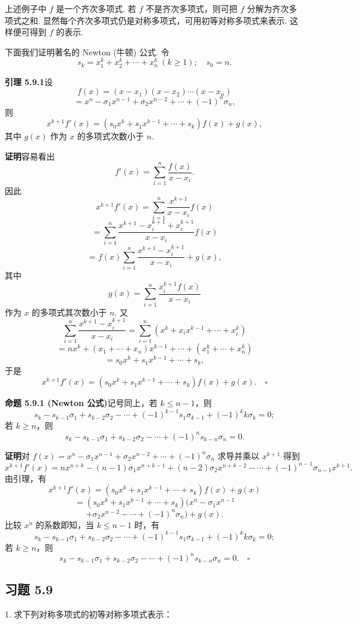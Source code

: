\documentclass[UTF8, 12pt, fontset=fandol, oneside]{ctexart}
\begin{document}
上述例子中 $f$ 是一个齐次多项式. 若 $f$ 不是齐次多项式，则可把 $f$ 分解为齐次多项式之和. 显然每个齐次多项式仍是对称多项式，可用初等对称多项式来表示. 这样便可得到 $f$ 的表示.

下面我们证明著名的 Newton (牛顿) 公式. 令
\[
s_k=x_1^k+x_2^k+\cdots+x_n^k\ (k\geq 1);\quad s_0=n.
\]

\noindent\textbf{引理 5.9.1}\quad 设
\[
f(x)=(x-x_1)(x-x_2)\cdots(x-x_n)
\]
\[
=x^n-\sigma_1x^{n-1}+\sigma_2x^{n-2}+\cdots+(-1)^n\sigma_n,
\]
则
\[
x^{k+1}f'(x)=(s_0x^k+s_1x^{k-1}+\cdots+s_k)f(x)+g(x),
\]
其中 $g(x)$ 作为 $x$ 的多项式次数小于 $n$.

\noindent\textbf{证明}\quad 容易看出
\[
f'(x)=\sum_{i=1}^n\frac{f(x)}{x-x_i}.
\]
因此
\[
x^{k+1}f'(x)=\sum_{i=1}^n\frac{x^{k+1}}{x-x_i}f(x)
\]
\[
=\sum_{i=1}^n\frac{x^{k+1}-x_i^{k+1}+x_i^{k+1}}{x-x_i}f(x)
\]
\[
=f(x)\sum_{i=1}^n\frac{x^{k+1}-x_i^{k+1}}{x-x_i}+g(x),
\]
其中
\[
g(x)=\sum_{i=1}^n\frac{x_i^{k+1}f(x)}{x-x_i}
\]
作为 $x$ 的多项式其次数小于 $n$. 又
\[
\sum_{i=1}^n\frac{x^{k+1}-x_i^{k+1}}{x-x_i}
=\sum_{i=1}^n(x^k+x_ix^{k-1}+\cdots+x_i^k)
\]
\[
=nx^k+(x_1+\cdots+x_n)x^{k-1}+\cdots+(x_1^k+\cdots+x_n^k)
\]
\[
=s_0x^k+s_1x^{k-1}+\cdots+s_k,
\]
于是
\[
x^{k+1}f'(x)=(s_0x^k+s_1x^{k-1}+\cdots+s_k)f(x)+g(x).\quad \square
\]

\noindent\textbf{命题 5.9.1 (Newton 公式)}\quad 记号同上，若 $k\leq n-1$，则
\[
s_k-s_{k-1}\sigma_1+s_{k-2}\sigma_2-\cdots+(-1)^{k-1}s_1\sigma_{k-1}+(-1)^kk\sigma_k=0;
\]
若 $k\geq n$，则
\[
s_k-s_{k-1}\sigma_1+s_{k-2}\sigma_2-\cdots+(-1)^ns_{k-n}\sigma_n=0.
\]

\noindent\textbf{证明}\quad 对 $f(x)=x^n-\sigma_1x^{n-1}+\sigma_2x^{n-2}+\cdots+(-1)^n\sigma_n$ 求导并乘以 $x^{k+1}$ 得到
\[
x^{k+1}f'(x)=nx^{n+k}-(n-1)\sigma_1x^{n+k-1}+(n-2)\sigma_2x^{n+k-2}-\cdots+(-1)^{n-1}\sigma_{n-1}x^{k+1}.
\]
由引理，有
\[
x^{k+1}f'(x)=(s_0x^k+s_1x^{k-1}+\cdots+s_k)f(x)+g(x)
\]
\[
=(s_0x^k+s_1x^{k-1}+\cdots+s_k)(x^n-\sigma_1x^{n-1}
\]
\[
+\sigma_2x^{n-2}-\cdots+(-1)^n\sigma_n)+g(x).
\]
比较 $x^n$ 的系数即知，当 $k\leq n-1$ 时，有
\[
s_k-s_{k-1}\sigma_1+s_{k-2}\sigma_2-\cdots+(-1)^{k-1}s_1\sigma_{k-1}+(-1)^kk\sigma_k=0;
\]
若 $k\geq n$，则
\[
s_k-s_{k-1}\sigma_1+s_{k-2}\sigma_2-\cdots+(-1)^ns_{k-n}\sigma_n=0.\quad \square
\]

\subsection*{习题 5.9}

1. 求下列对称多项式的初等对称多项式表示：
\end{document}
